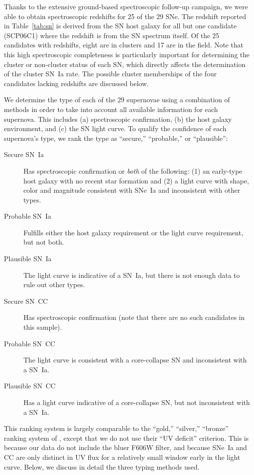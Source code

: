 Thanks to the extensive ground-based spectroscopic follow-up campaign,
we were able to obtain spectroscopic redshifts for 25 of the 29
SNe. The redshift reported in Table~\ref{tab:sn} is derived from the
SN host galaxy for all but one candidate (SCP06C1) where the redshift
is from the SN spectrum itself. Of the 25 candidates with redshifts,
eight are in clusters and 17 are in the field. Note that this high
spectroscopic completeness is particularly important for determining
the cluster or non-cluster status of each SN, which directly affects
the determination of the cluster SN~Ia rate. The possible cluster
memberships of the four candidates lacking redshifts are discussed
below.

We determine the type of each of the 29 supernovae using a combination
of methods in order to take into account all available information for
each supernova. This includes (a) spectroscopic confirmation, (b) the
host galaxy environment, and (c) the SN light curve. To qualify the
confidence of each supernova's type, we rank the type as ``secure,''
``probable,'' or ``plausible'':
\begin{description}
\item[Secure SN~Ia] Has
spectroscopic confirmation or \emph{both} of the following: (1) an
early-type host galaxy with no recent star formation and (2) a light
curve with shape, color and magnitude consistent with SNe~Ia and
inconsistent with other types.
\item[Probable SN~Ia] Fulfills either the host galaxy 
requirement or the light curve requirement, but not both.
\item[Plausible SN~Ia] The light curve is indicative of a SN~Ia, 
but there is not enough data to rule out other types.
\item[Secure SN~CC] Has spectroscopic confirmation (note that 
there are no such candidates in this sample). 
\item[Probable SN~CC] The light curve is consistent with a 
core-collapse SN and inconsistent with a SN~Ia. 
\item[Plausible SN~CC] Has a light curve indicative
of a core-collapse SN, but not inconsistent with a SN~Ia. 
\end{description}
This ranking system is largely comparable to the ``gold,'' ``silver,''
``bronze'' ranking system of \citet{strolger04a}, except that we do
not use their ``UV deficit'' criterion. This is because our data do
not include the bluer F606W filter, and because SNe~Ia and CC are
only distinct in UV flux for a relatively small window early in the
light curve. Below, we discuss in detail the three typing methods used.

